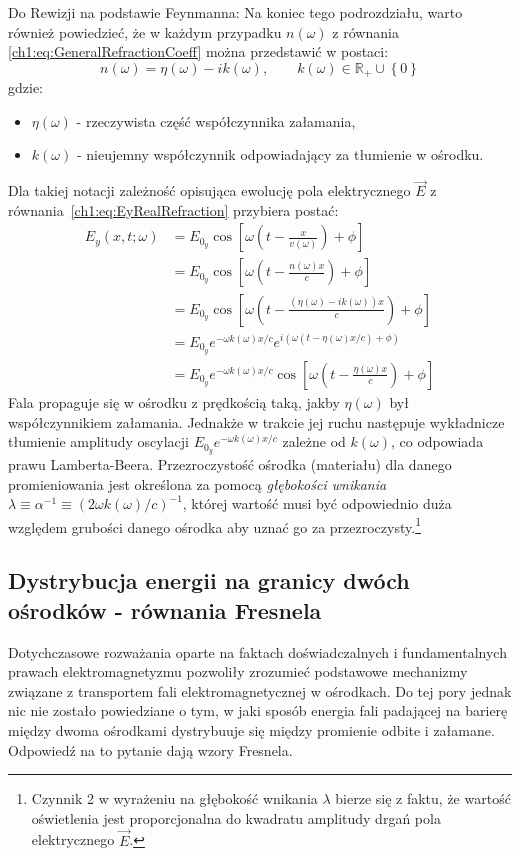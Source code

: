 {\color{red}Do Rewizji na podstawie Feynmanna:}
Na koniec tego podrozdziału, warto również powiedzieć, że w każdym przypadku $n(\omega)$ z równania \eqref{ch1:eq:GeneralRefractionCoeff} można przedstawić w postaci:
\begin{equation}
n(\omega) = \eta(\omega) - ik(\omega),\qquad k(\omega)\in\mathbb{R_+}\cup\left\lbrace 0 \right\rbrace
\label{ch1:eq:SimplifiedRefractionCoeff}
\end{equation}
gdzie:
\begin{itemize}
\item[] $\eta(\omega)$ - rzeczywista część współczynnika załamania,
\item[] $k(\omega)$ - nieujemny współczynnik odpowiadający za tłumienie w ośrodku.
\end{itemize}
Dla takiej notacji zależność opisująca ewolucję pola elektrycznego $\vec{E}$ z równania~\eqref{ch1:eq:EyRealRefraction} przybiera postać:
\begin{align}
E_y(x,t; \omega) 	&= E_{0_y}\cos\left[\omega\left(t - \frac{x}{v(\omega)} \right) + \phi \right]\nonumber\\
					&= E_{0_y}\cos\left[\omega\left(t - \frac{n(\omega)x}{c} \right) + \phi \right]\nonumber\\
					&= E_{0_y}\cos\left[\omega\left(t - \frac{(\eta(\omega) - ik(\omega))x}{c} \right) + \phi \right]\nonumber\\
					&= E_{0_y}e^{-\omega k(\omega)x/c}e^{i\left(\omega\left(t - \eta(\omega)x/c \right) + \phi \right)}\nonumber\\
					&= E_{0_y}e^{-\omega k(\omega)x/c}\cos\left[\omega\left(t - \frac{\eta(\omega)x}{c} \right) + \phi \right]
\end{align}
Fala propaguje się w ośrodku z prędkością taką, jakby $\eta(\omega)$ był współczynnikiem załamania. Jednakże w trakcie jej ruchu następuje wykładnicze tłumienie amplitudy oscylacji $E_{0_y}e^{-\omega k(\omega)x/c}$ zależne od $k(\omega)$, co odpowiada prawu Lamberta-Beera. Przezroczystość ośrodka (materiału) dla danego promieniowania jest określona za pomocą \textit{głębokości wnikania} $\lambda\equiv\alpha^{-1}\equiv \left(2\omega k(\omega)/c\right)^{-1}$, której wartość musi być odpowiednio duża względem grubości danego ośrodka aby uznać go za przezroczysty.\footnote{Czynnik 2 w wyrażeniu na głębokość wnikania $\lambda$ bierze się z faktu, że wartość oświetlenia jest proporcjonalna do kwadratu amplitudy drgań pola elektrycznego $\vec{E}$.}

\subsection{Dystrybucja energii na granicy dwóch ośrodków - równania Fresnela}
Dotychczasowe rozważania oparte na faktach doświadczalnych i fundamentalnych prawach elektromagnetyzmu pozwoliły zrozumieć podstawowe mechanizmy związane z transportem fali elektromagnetycznej w ośrodkach. Do tej pory jednak nic nie zostało powiedziane o tym, w jaki sposób energia fali padającej na barierę między dwoma ośrodkami dystrybuuje się między promienie odbite i załamane. Odpowiedź na to pytanie dają wzory Fresnela.

